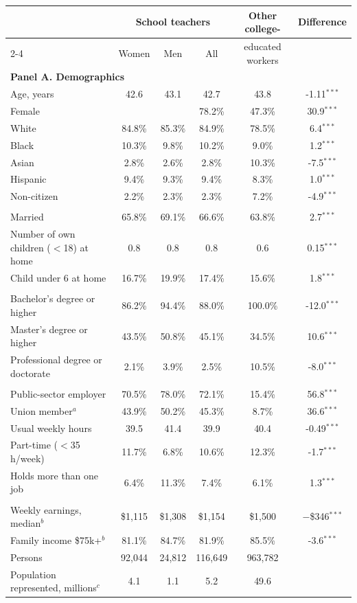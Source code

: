 \begin{tabular}{lccccc}
\toprule
 & \multicolumn{3}{c}{School teachers} & Other college- & Difference \\
\cmidrule(lr){2-4}
 & Women & Men & All & educated workers & \\
\midrule
\multicolumn{6}{l}{\textbf{Panel A. Demographics}} \\[2pt]
Age, years & 42.6 & 43.1 & 42.7 & 43.8 & -1.11$^{***}$ \\
Female &  &  & 78.2\% & 47.3\% & 30.9$^{***}$ \\
White & 84.8\% & 85.3\% & 84.9\% & 78.5\% & 6.4$^{***}$ \\
Black & 10.3\% & 9.8\% & 10.2\% & 9.0\% & 1.2$^{***}$ \\
Asian & 2.8\% & 2.6\% & 2.8\% & 10.3\% & -7.5$^{***}$ \\
Hispanic & 9.4\% & 9.3\% & 9.4\% & 8.3\% & 1.0$^{***}$ \\
Non-citizen & 2.2\% & 2.3\% & 2.3\% & 7.2\% & -4.9$^{***}$ \\
\addlinespace[6pt]
\multicolumn{6}{l}{\textbf{Panel B. Family}} \\[2pt]
Married & 65.8\% & 69.1\% & 66.6\% & 63.8\% & 2.7$^{***}$ \\
Number of own children ($<$18) at home & 0.8 & 0.8 & 0.8 & 0.6 & 0.15$^{***}$ \\
Child under 6 at home & 16.7\% & 19.9\% & 17.4\% & 15.6\% & 1.8$^{***}$ \\
\addlinespace[6pt]
\multicolumn{6}{l}{\textbf{Panel C. Education}} \\[2pt]
Bachelor's degree or higher & 86.2\% & 94.4\% & 88.0\% & 100.0\% & -12.0$^{***}$ \\
Master's degree or higher & 43.5\% & 50.8\% & 45.1\% & 34.5\% & 10.6$^{***}$ \\
Professional degree or doctorate & 2.1\% & 3.9\% & 2.5\% & 10.5\% & -8.0$^{***}$ \\
\addlinespace[6pt]
\multicolumn{6}{l}{\textbf{Panel D. The job}} \\[2pt]
Public-sector employer & 70.5\% & 78.0\% & 72.1\% & 15.4\% & 56.8$^{***}$ \\
Union member$^{a}$ & 43.9\% & 50.2\% & 45.3\% & 8.7\% & 36.6$^{***}$ \\
Usual weekly hours & 39.5 & 41.4 & 39.9 & 40.4 & -0.49$^{***}$ \\
Part-time ($<$35 h/week) & 11.7\% & 6.8\% & 10.6\% & 12.3\% & -1.7$^{***}$ \\
Holds more than one job & 6.4\% & 11.3\% & 7.4\% & 6.1\% & 1.3$^{***}$ \\
\addlinespace[6pt]
\multicolumn{6}{l}{\textbf{Panel E. Pay and income}} \\[2pt]
Weekly earnings, median$^{b}$ & \$1,115 & \$1,308 & \$1,154 & \$1,500 & $-$\$346$^{***}$ \\
Family income \$75k+$^{b}$ & 81.1\% & 84.7\% & 81.9\% & 85.5\% & -3.6$^{***}$ \\
\addlinespace[6pt]
\midrule
Persons & 92,044 & 24,812 & 116,649 & 963,782 & \\
Population represented, millions$^{c}$ & 4.1 & 1.1 & 5.2 & 49.6 & \\
\bottomrule
\end{tabular}
